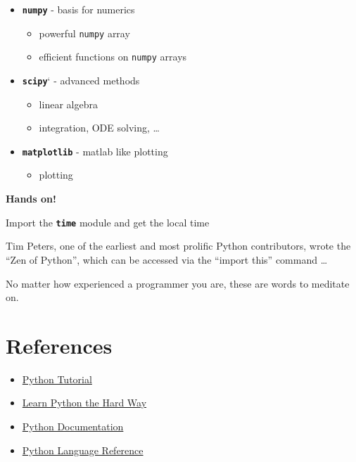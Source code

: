 \documentclass{article}
\begin{document}
\begin{itemize}
\item
  \textbf{\texttt{numpy}} - basis for numerics

  \begin{itemize}
  \item
    powerful \texttt{numpy} array
  \item
    efficient functions on \texttt{numpy} arrays
  \end{itemize}
\item
  \textbf{\texttt{scipy}}` - advanced methods

  \begin{itemize}
  \item
    linear algebra
  \item
    integration, ODE solving, \ldots{}
  \end{itemize}
\item
  \textbf{\texttt{matplotlib}} - matlab like plotting

  \begin{itemize}
  \itemsep1pt\parskip0pt
  \item
    plotting
  \end{itemize}
\end{itemize}

    \textbf{Hands on!}

Import the \textbf{\texttt{time}} module and get the local time

    Tim Peters, one of the earliest and most prolific Python contributors,
wrote the ``Zen of Python'', which can be accessed via the ``import
this'' command \ldots{}

No matter how experienced a programmer you are, these are words to
meditate on.

    \section{References}\label{references}

\begin{itemize}
\itemsep1pt\parskip0pt
\item
  \href{http://docs.python.org/2/tutorial/}{Python Tutorial}
\item
  \href{http://learnpythonthehardway.org/book/}{Learn Python the Hard
  Way}
\item
  \href{http://docs.python.org/2.7/}{Python Documentation}
\item
  \href{http://docs.python.org/2.7/reference/index.html}{Python Language
  Reference}
\end{itemize}
\end{document}
